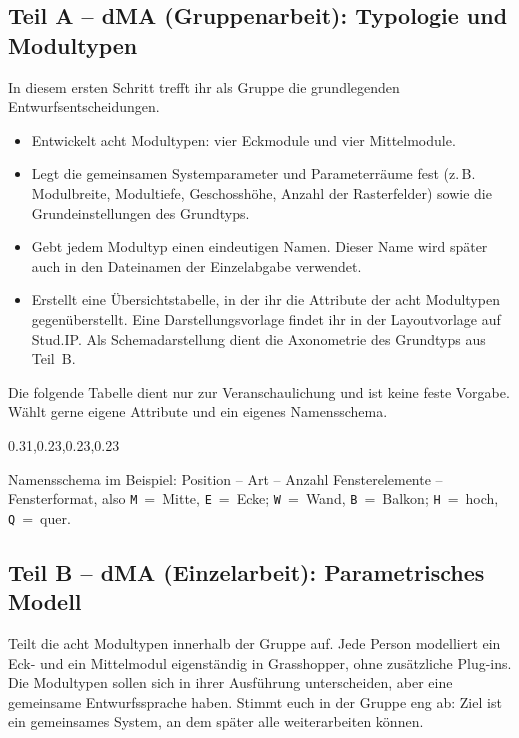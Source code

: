 \subsection{Teil A – dMA (Gruppenarbeit): Typologie und Modultypen}
In diesem ersten Schritt trefft ihr als Gruppe die grundlegenden Entwurfsentscheidungen.
\begin{itemize}
  \item Entwickelt acht Modultypen: vier Eckmodule und vier Mittelmodule.
  \item Legt die gemeinsamen Systemparameter und Parameterräume fest (z.\,B. Modulbreite, Modultiefe, Geschosshöhe, Anzahl der Rasterfelder) sowie die Grundeinstellungen des Grundtyps.
  \item Gebt jedem Modultyp einen eindeutigen Namen. Dieser Name wird später auch in den Dateinamen der Einzelabgabe verwendet.
  \item Erstellt eine Übersichtstabelle, in der ihr die Attribute der acht Modultypen gegenüberstellt. Eine Darstellungsvorlage findet ihr in der Layoutvorlage auf Stud.IP. Als Schemadarstellung dient die Axonometrie des Grundtyps aus Teil~B.
\end{itemize}
Die folgende Tabelle dient nur zur Veranschaulichung und ist keine feste Vorgabe. Wählt gerne eigene Attribute und ein eigenes Namensschema.
\begin{Table}[title=Beispiel für die Übersichtstabelle, break=false]
\begin{SemioTable}{0.31,0.23,0.23,0.23}
\end{SemioTable}
\end{Table}
Namensschema im Beispiel: Position – Art – Anzahl Fensterelemente – Fensterformat, also \texttt{M}~=~Mitte, \texttt{E}~=~Ecke; \texttt{W}~=~Wand, \texttt{B}~=~Balkon; \texttt{H}~=~hoch, \texttt{Q}~=~quer.
\subsection{Teil B – dMA (Einzelarbeit): Parametrisches Modell}
Teilt die acht Modultypen innerhalb der Gruppe auf. Jede Person modelliert ein Eck- und ein Mittelmodul eigenständig in Grasshopper, ohne zusätzliche Plug-ins. Die Modultypen sollen sich in ihrer Ausführung unterscheiden, aber eine gemeinsame Entwurfssprache haben. Stimmt euch in der Gruppe eng ab: Ziel ist ein gemeinsames System, an dem später alle weiterarbeiten können.

